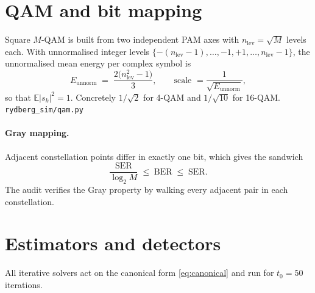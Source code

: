 \documentclass[11pt,a4paper]{article}
\newcommand{\src}[1]{{\footnotesize\color{srcgray}\texttt{#1}}}
\newcommand{\E}{\mathbb{E}}
\newcommand{\BER}{\mathrm{BER}}
\newcommand{\SER}{\mathrm{SER}}
\begin{document}
\section{QAM and bit mapping}\label{sec:qam}

Square $M$-QAM is built from two independent PAM axes with
$n_{\mathrm{lev}}=\sqrt{M}$ levels each. With unnormalised integer levels
$\{-(n_{\mathrm{lev}}-1),\dots,-1,+1,\dots,n_{\mathrm{lev}}-1\}$, the
unnormalised mean energy per complex symbol is
\begin{equation}
E_{\mathrm{unnorm}} \;=\; \frac{2\bigl(n_{\mathrm{lev}}^2-1\bigr)}{3},
\qquad
\text{scale } = \frac{1}{\sqrt{E_{\mathrm{unnorm}}}},
\label{eq:qamnorm}
\end{equation}
so that $\E|s_k|^2 = 1$. Concretely $1/\sqrt{2}$ for 4-QAM and $1/\sqrt{10}$
for 16-QAM. \src{rydberg\_sim/qam.py}

\paragraph{Gray mapping.} Adjacent constellation points differ in exactly one
bit, which gives the sandwich
\begin{equation}
\frac{\SER}{\log_2 M} \;\le\; \BER \;\le\; \SER .
\label{eq:gray}
\end{equation}
The audit verifies the Gray property by walking every adjacent pair in each
constellation.

\section{Estimators and detectors}\label{sec:algos}

All iterative solvers act on the canonical form \eqref{eq:canonical} and run
for $t_0=50$ iterations.
\end{document}
